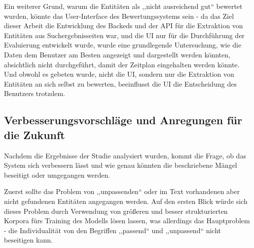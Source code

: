 Ein weiterer Grund, warum die Entitäten als ,,nicht ausreichend gut`` bewertet wurden, könnte das User-Interface des Bewertungssystems sein - da das Ziel dieser Arbeit die Entwicklung des Backeds und der API für die Extraktion von Entitäten aus Suchergebnisseiten war, und die UI nur für die Durchführung der Evaluierung entwickelt wurde, wurde eine grundlegende Untersuchung, wie die Daten dem Benutzer am Besten angezeigt und dargestellt werden könnten, absichtlich nicht durchgeführt, damit der Zeitplan eingehalten werden könnte. Und obwohl es gebeten wurde, nicht die UI, sondern nur die Extraktion von Entitäten an sich selbst zu bewerten, beeinflusst die UI die Entscheidung des Benutzers trotzdem. 

\subsection{Verbesserungsvorschläge und Anregungen für die Zukunft}
Nachdem die Ergebnisse der Studie analysiert wurden, kommt die Frage, ob das System sich verbessern lässt und wie genau könnten die beschriebene Mängel beseitigt oder umgegangen werden.

Zuerst sollte das Problem von ,,unpassenden`` oder im Text vorhandenen aber nicht gefundenen Entitäten angegangen werden. Auf den ersten Blick würde sich dieses Problem durch Verwendung von größeren und besser strukturierten Korpora fürs Training des Modells lösen lassen, was allerdings das Hauptproblem - die Individualität von den Begriffen ,,passend`` und ,,unpassend`` nicht beseitigen kann.

